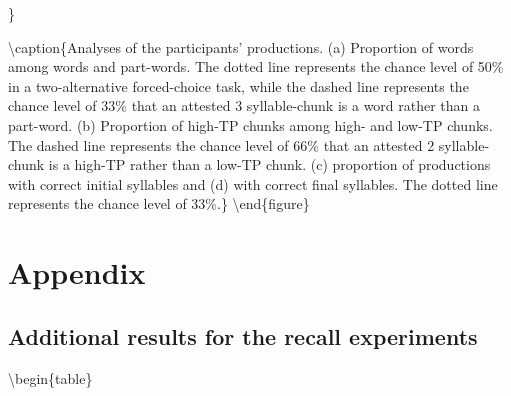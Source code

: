 \documentclass[]{article}
\begin{document}
\}

\textbackslash{}caption\{Analyses of the participants' productions. (a)
Proportion of words among words and part-words. The dotted line
represents the chance level of 50\% in a two-alternative forced-choice
task, while the dashed line represents the chance level of 33\% that an
attested 3 syllable-chunk is a word rather than a part-word. (b)
Proportion of high-TP chunks among high- and low-TP chunks. The dashed
line represents the chance level of 66\% that an attested 2
syllable-chunk is a high-TP rather than a low-TP chunk. (c) proportion
of productions with correct initial syllables and (d) with correct final
syllables. The dotted line represents the chance level of
33\%.\}\label{fig:recall-w-pw-chunks-positions-plot}
\textbackslash{}end\{figure\}

\clearpage

\section{Appendix}\label{appendix}

\subsection{Additional results for the recall
experiments}\label{additional-results-for-the-recall-experiments}

\textbackslash{}begin\{table\}
\end{document}
